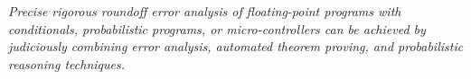 %
\emph{
Precise rigorous roundoff error analysis of floating-point programs with conditionals, probabilistic programs, or micro-controllers can be achieved by judiciously combining error analysis, automated theorem proving, and probabilistic reasoning techniques.
%
%	
%
%
%
%
%
}

%
%
%
%
